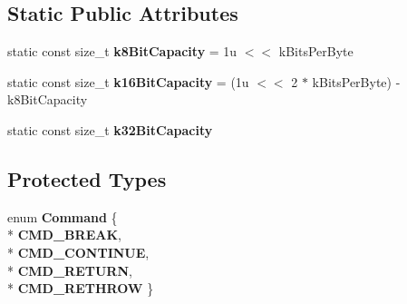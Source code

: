 \subsection*{Static Public Attributes}
\begin{DoxyCompactItemize}
\item 
static const size\+\_\+t {\bfseries k8\+Bit\+Capacity} = 1u $<$$<$ k\+Bits\+Per\+Byte\hypertarget{classv8_1_1internal_1_1interpreter_1_1_b_a_s_e___e_m_b_e_d_d_e_d_ac101bb13e6a4d356c4c986b7f01ab4b7}{}\label{classv8_1_1internal_1_1interpreter_1_1_b_a_s_e___e_m_b_e_d_d_e_d_ac101bb13e6a4d356c4c986b7f01ab4b7}

\item 
static const size\+\_\+t {\bfseries k16\+Bit\+Capacity} = (1u $<$$<$ 2 $\ast$ k\+Bits\+Per\+Byte) -\/ k8\+Bit\+Capacity\hypertarget{classv8_1_1internal_1_1interpreter_1_1_b_a_s_e___e_m_b_e_d_d_e_d_a01a8e136298dd678eb3a07b332a94f13}{}\label{classv8_1_1internal_1_1interpreter_1_1_b_a_s_e___e_m_b_e_d_d_e_d_a01a8e136298dd678eb3a07b332a94f13}

\item 
static const size\+\_\+t {\bfseries k32\+Bit\+Capacity}
\end{DoxyCompactItemize}
\subsection*{Protected Types}
\begin{DoxyCompactItemize}
\item 
enum {\bfseries Command} \{ \\*
{\bfseries C\+M\+D\+\_\+\+B\+R\+E\+AK}, 
\\*
{\bfseries C\+M\+D\+\_\+\+C\+O\+N\+T\+I\+N\+UE}, 
\\*
{\bfseries C\+M\+D\+\_\+\+R\+E\+T\+U\+RN}, 
\\*
{\bfseries C\+M\+D\+\_\+\+R\+E\+T\+H\+R\+OW}
 \}\hypertarget{classv8_1_1internal_1_1interpreter_1_1_b_a_s_e___e_m_b_e_d_d_e_d_a8dba4e24fcc4d60619aff2b0775f0a34}{}\label{classv8_1_1internal_1_1interpreter_1_1_b_a_s_e___e_m_b_e_d_d_e_d_a8dba4e24fcc4d60619aff2b0775f0a34}

\end{DoxyCompactItemize}
